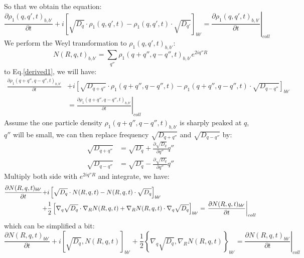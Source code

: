 \documentclass{article}
\begin{document}
So that we obtain the equation:
\begin{equation}
    \frac{\partial \rho_1(q,q',t)_{b,b'} }{\partial t} + i \left[ \sqrt{D_q}\cdot \rho_1(q,q',t) - \rho_1(q,q',t) \cdot \sqrt{D_{q'}} \right] _{bb'}
     = \left. \frac{\partial \rho_1(q,q',t)_{b,b'} }{\partial t} \right|_{coll}  \label{derived1}
\end{equation}
We perform the Weyl transformation to $\rho_1(q,q',t)_{b,b'}$:
\begin{equation}
    N(R,q,t)_{b,b'} = \sum_{q''} \rho_1(q+q'',q-q'',t)_{b,b'} e^{2iq''R}
\end{equation}
to Eq.\ref{derived1}, we will have:
\begin{align}
    \frac{\partial \rho_1(q+q'',q-q'',t)_{b,b'} }{\partial t} &+ i \left[ \sqrt{D_{q+q''}}\cdot \rho_1(q+q'',q-q'',t) - \rho_1(q+q'',q-q'',t) \cdot \sqrt{D_{q-q''}} \right] _{bb'}
    \\ &= \left. \frac{\partial \rho_1(q+q'',q-q'',t)_{b,b'} }{\partial t} \right|_{coll}
\end{align}
Assume the one particle density $\rho_1(q+q'',q-q'',t)_{b,b'}$ is sharply peaked at $q$, $q''$ will be small,
we can then replace frequency $\sqrt{D_{q+q''}}$ and $\sqrt{D_{q-q''}}$ by:
\begin{align}
    \sqrt{D_{q+q''}} &= \sqrt{D_q} + \frac{\partial\sqrt{D_q}}{\partial q''} q''\\
    \sqrt{D_{q-q''}} &= \sqrt{D_q} - \frac{\partial\sqrt{D_q}}{\partial q''} q''
\end{align}
Multiply both side with $e^{2iq''R}$ and integrate, we have:
\begin{align}
    \frac{\partial N(R,q,t)_{bb'}}{\partial t} + &i \left[ \sqrt{D_q}\cdot N(R,q,t) - N(R,q,t) \cdot \sqrt{D_q} \right] _{bb'} \notag \\
    + &\frac{1}{2} \left[ \nabla_q\sqrt{D_q} \cdot \nabla_R N(R,q,t) + \nabla_R N(R,q,t) \cdot \nabla_q\sqrt{D_q}  \right]_{bb'} = \left. \frac{\partial N(R,q,t)_{bb'} }{\partial t} \right|_{coll}
\end{align}
which can be simplified a bit:
\begin{equation}
    \frac{\partial N(R,q,t)_{bb'}}{\partial t} + i \left[ \sqrt{D_q}, N(R,q,t) \right] _{bb'} 
    + \frac{1}{2} \left\{ \nabla_q\sqrt{D_q} , \nabla_R N(R,q,t) \right\}_{bb'} = \left. \frac{\partial N(R,q,t)_{bb'} }{\partial t} \right|_{coll}
\end{equation}
\end{document}
